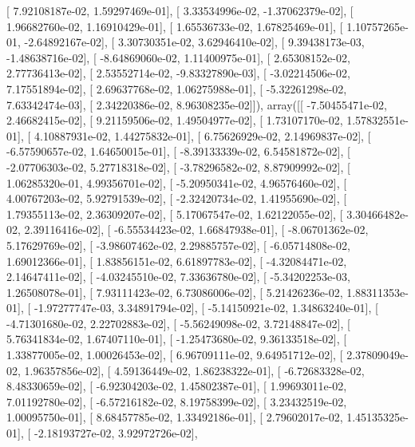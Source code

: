 \documentclass{article}
\begin{document}
       [  7.92108187e-02,   1.59297469e-01],
       [  3.33534996e-02,  -1.37062379e-02],
       [  1.96682760e-02,   1.16910429e-01],
       [  1.65536733e-02,   1.67825469e-01],
       [  1.10757265e-01,  -2.64892167e-02],
       [  3.30730351e-02,   3.62946410e-02],
       [  9.39438173e-03,  -1.48638716e-02],
       [ -8.64869060e-02,   1.11400975e-01],
       [  2.65308152e-02,   2.77736413e-02],
       [  2.53552714e-02,  -9.83327890e-03],
       [ -3.02214506e-02,   7.17551894e-02],
       [  2.69637768e-02,   1.06275988e-01],
       [ -5.32261298e-02,   7.63342474e-03],
       [  2.34220386e-02,   8.96308235e-02]]), array([[ -7.50455471e-02,   2.46682415e-02],
       [  9.21159506e-02,   1.49504977e-02],
       [  1.73107170e-02,   1.57832551e-01],
       [  4.10887931e-02,   1.44275832e-01],
       [  6.75626929e-02,   2.14969837e-02],
       [ -6.57590657e-02,   1.64650015e-01],
       [ -8.39133339e-02,   6.54581872e-02],
       [ -2.07706303e-02,   5.27718318e-02],
       [ -3.78296582e-02,   8.87909992e-02],
       [  1.06285320e-01,   4.99356701e-02],
       [ -5.20950341e-02,   4.96576460e-02],
       [  4.00767203e-02,   5.92791539e-02],
       [ -2.32420734e-02,   1.41955690e-02],
       [  1.79355113e-02,   2.36309207e-02],
       [  5.17067547e-02,   1.62122055e-02],
       [  3.30466482e-02,   2.39116416e-02],
       [ -6.55534423e-02,   1.66847938e-01],
       [ -8.06701362e-02,   5.17629769e-02],
       [ -3.98607462e-02,   2.29885757e-02],
       [ -6.05714808e-02,   1.69012366e-01],
       [  1.83856151e-02,   6.61897783e-02],
       [ -4.32084471e-02,   2.14647411e-02],
       [ -4.03245510e-02,   7.33636780e-02],
       [ -5.34202253e-03,   1.26508078e-01],
       [  7.93111423e-02,   6.73086006e-02],
       [  5.21426236e-02,   1.88311353e-01],
       [ -1.97277747e-03,   3.34891794e-02],
       [ -5.14150921e-02,   1.34863240e-01],
       [ -4.71301680e-02,   2.22702883e-02],
       [ -5.56249098e-02,   3.72148847e-02],
       [  5.76341834e-02,   1.67407110e-01],
       [ -1.25473680e-02,   9.36133518e-02],
       [  1.33877005e-02,   1.00026453e-02],
       [  6.96709111e-02,   9.64951712e-02],
       [  2.37809049e-02,   1.96357856e-02],
       [  4.59136449e-02,   1.86238322e-01],
       [ -6.72683328e-02,   8.48330659e-02],
       [ -6.92304203e-02,   1.45802387e-01],
       [  1.99693011e-02,   7.01192780e-02],
       [ -6.57216182e-02,   8.19758399e-02],
       [  3.23432519e-02,   1.00095750e-01],
       [  8.68457785e-02,   1.33492186e-01],
       [  2.79602017e-02,   1.45135325e-01],
       [ -2.18193727e-02,   3.92972726e-02],
\end{document}
